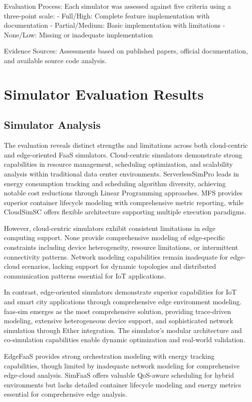 Evaluation Process: Each simulator was assessed against five criteria using a three-point scale:
- Full/High: Complete feature implementation with documentation
- Partial/Medium: Basic implementation with limitations
- None/Low: Missing or inadequate implementation

Evidence Sources: Assessments based on published papers, official documentation, and available source code analysis.

\section{Simulator Evaluation Results}

\subsection{Simulator Analysis}

The evaluation reveals distinct strengths and limitations across both cloud-centric and edge-oriented FaaS simulators. Cloud-centric simulators demonstrate strong capabilities in resource management, scheduling optimization, and scalability analysis within traditional data center environments. ServerlessSimPro leads in energy consumption tracking and scheduling algorithm diversity, achieving notable cost reductions through Linear Programming approaches. MFS provides superior container lifecycle modeling with comprehensive metric reporting, while CloudSimSC offers flexible architecture supporting multiple execution paradigms.

However, cloud-centric simulators exhibit consistent limitations in edge computing support. None provide comprehensive modeling of edge-specific constraints including device heterogeneity, resource limitations, or intermittent connectivity patterns. Network modeling capabilities remain inadequate for edge-cloud scenarios, lacking support for dynamic topologies and distributed communication patterns essential for IoT applications.

In contrast, edge-oriented simulators demonstrate superior capabilities for IoT and smart city applications through comprehensive edge environment modeling. faas-sim emerges as the most comprehensive solution, providing trace-driven modeling, extensive heterogeneous device support, and sophisticated network simulation through Ether integration. The simulator's modular architecture and co-simulation capabilities enable dynamic optimization and real-world validation.

EdgeFaaS provides strong orchestration modeling with energy tracking capabilities, though limited by inadequate network modeling for comprehensive edge-cloud analysis. SimFaaS offers valuable QoS-aware scheduling for hybrid environments but lacks detailed container lifecycle modeling and energy metrics essential for comprehensive edge analysis.


